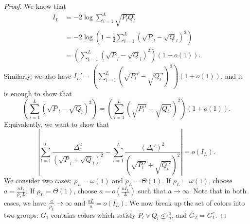 \documentclass{article}
\begin{document}
\begin{proof}
We know that 
\begin{align*}
I_L &= -2\log \sum_{i=1}^L \sqrt{P_lQ_l}\\
&= -2\log\left(1 - \frac{1}{2}\sum_{i=1}^L (\sqrt P_l - \sqrt Q_l)^2\right)\\
&=\left( \sum_{i=1}^L (\sqrt P_l - \sqrt Q_l)^2\right) (1+o(1)).
\end{align*}
Similarly, we also have $I_L' = \left( \sum_{i=1}^L (\sqrt {P_l'} - \sqrt {Q_l'})^2\right) (1+o(1))$, and it is enough to show that 
$$\left( \sum_{i=1}^L (\sqrt P_l - \sqrt Q_l)^2\right) = \left( \sum_{i=1}^L (\sqrt {P_l'} - \sqrt {Q_l'})^2\right) (1+o(1)).$$ 
Equivalently, we want to show that
$$\left | \sum_{l=1}^L \frac{\Delta_l^2}{(\sqrt P_l + \sqrt Q_l)^2} - \sum_{l=1}^L \frac{(\Delta_l')^2}{(\sqrt{P_l'} + \sqrt{Q_l'})^2} \right | = o(I_L).$$
We consider two cases: $\rho_L = \omega(1)$ and $\rho_L = \Theta(1)$. If $\rho_L = \omega(1)$, choose $a = \frac{nI_L}{\rho_L L}$. If $\rho_L = \Theta(1)$, choose $a = o\left(\frac{nI_L}{L}\right)$ such that $a \to \infty$. Note that in both cases, we have $\frac{a}{\rho_L} \to \infty$ and $\frac{aL}{n} = o(I_L)$. We now break up the set of colors into two groups: $G_1$ contains colors which satisfy $P_l \vee Q_l \leq \frac{a}{n}$, and $G_2$ = $G_1^c$. 


\end{proof}
\end{document}
